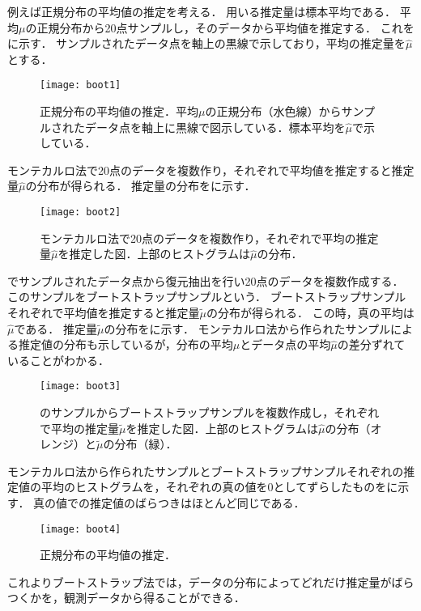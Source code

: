 例えば正規分布の平均値の推定を考える．
用いる推定量は標本平均である．
平均$\mu$の正規分布から20点サンプルし，そのデータから平均値を推定する．
これをに示す．
サンプルされたデータ点を軸上の黒線で示しており，平均の推定量を$\hat{\mu}$とする．
\begin{figure}[htbp]
	\centering
	\texttt{[image: boot1]}
	\caption{正規分布の平均値の推定．平均$\mu$の正規分布（水色線）からサンプルされたデータ点を軸上に黒線で図示している．標本平均を$\hat{\mu}$で示している．}
	\label{fig:boot1}
\end{figure}
モンテカルロ法で20点のデータを複数作り，それぞれで平均値を推定すると推定量$\hat{\mu}$の分布が得られる．
推定量の分布をに示す．
\begin{figure}[htbp]
	\centering
	\texttt{[image: boot2]}
	\caption{モンテカルロ法で20点のデータを複数作り，それぞれで平均の推定量$\hat{\mu}$を推定した図．上部のヒストグラムは$\hat{\mu}$の分布．}
	\label{fig:boot2}
\end{figure}
でサンプルされたデータ点から復元抽出を行い20点のデータを複数作成する．
このサンプルをブートストラップサンプルという．
ブートストラップサンプルそれぞれで平均値を推定すると推定量$\tilde{\mu}$の分布が得られる．
この時，真の平均は$\hat{\mu}$である．
推定量$\tilde{\mu}$の分布をに示す．
モンテカルロ法から作られたサンプルによる推定値の分布も示しているが，分布の平均$\mu$とデータ点の平均$\hat{\mu}$の差分ずれていることがわかる．
\begin{figure}[htbp]
	\centering
	\texttt{[image: boot3]}
	\caption{のサンプルからブートストラップサンプルを複数作成し，それぞれで平均の推定量$\tilde{\mu}$を推定した図．上部のヒストグラムは$\hat{\mu}$の分布（オレンジ）と$\tilde{\mu}$の分布（緑）．}
	\label{fig:boot3}
\end{figure}
モンテカルロ法から作られたサンプルとブートストラップサンプルそれぞれの推定値の平均のヒストグラムを，それぞれの真の値を0としてずらしたものをに示す．
真の値での推定値のばらつきはほとんど同じである．
\begin{figure}[htbp]
	\centering
	\texttt{[image: boot4]}
	\caption{正規分布の平均値の推定．}
	\label{fig:boot4}
\end{figure}
これよりブートストラップ法では，データの分布によってどれだけ推定量がばらつくかを，観測データから得ることができる．

